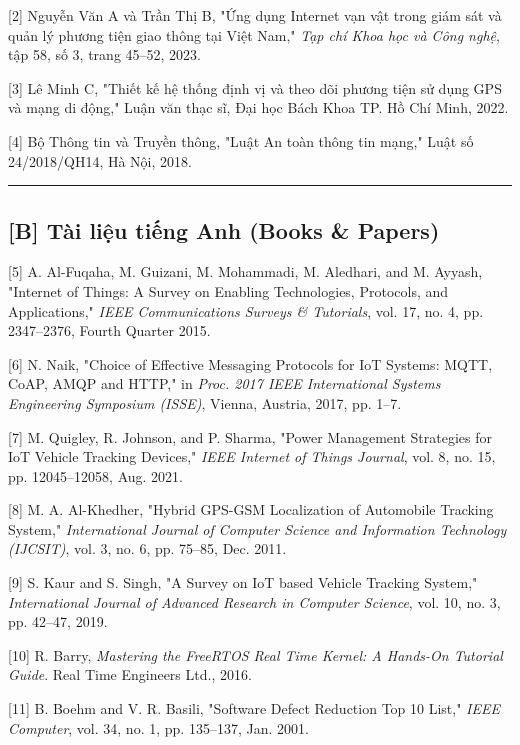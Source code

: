 \documentclass[a4paper]{extarticle}
\begin{document}
{[}2{]} Nguyễn Văn A và Trần Thị B, "Ứng dụng Internet vạn vật trong
giám sát và quản lý phương tiện giao thông tại Việt Nam," \emph{Tạp chí
Khoa học và Công nghệ}, tập 58, số 3, trang 45--52, 2023.

{[}3{]} Lê Minh C, "Thiết kế hệ thống định vị và theo dõi phương tiện sử
dụng GPS và mạng di động," Luận văn thạc sĩ, Đại học Bách Khoa TP. Hồ
Chí Minh, 2022.

{[}4{]} Bộ Thông tin và Truyền thông, "Luật An toàn thông tin mạng,"
Luật số 24/2018/QH14, Hà Nội, 2018.

\begin{center}\rule{0.5\linewidth}{0.5pt}\end{center}

\subsection{{[}B{]} Tài liệu tiếng Anh (Books \&
Papers)}\label{b-tuxe0i-liux1ec7u-tiux1ebfng-anh-books--papers}

{[}5{]} A. Al-Fuqaha, M. Guizani, M. Mohammadi, M. Aledhari, and M.
Ayyash, "Internet of Things: A Survey on Enabling Technologies,
Protocols, and Applications," \emph{IEEE Communications Surveys \&
Tutorials}, vol. 17, no. 4, pp. 2347--2376, Fourth Quarter 2015.

{[}6{]} N. Naik, "Choice of Effective Messaging Protocols for IoT
Systems: MQTT, CoAP, AMQP and HTTP," in \emph{Proc. 2017 IEEE
International Systems Engineering Symposium (ISSE)}, Vienna, Austria,
2017, pp. 1--7.

{[}7{]} M. Quigley, R. Johnson, and P. Sharma, "Power Management
Strategies for IoT Vehicle Tracking Devices," \emph{IEEE Internet of
Things Journal}, vol. 8, no. 15, pp. 12045--12058, Aug. 2021.

{[}8{]} M. A. Al-Khedher, "Hybrid GPS-GSM Localization of Automobile
Tracking System," \emph{International Journal of Computer Science and
Information Technology (IJCSIT)}, vol. 3, no. 6, pp. 75--85, Dec. 2011.

{[}9{]} S. Kaur and S. Singh, "A Survey on IoT based Vehicle Tracking
System," \emph{International Journal of Advanced Research in Computer
Science}, vol. 10, no. 3, pp. 42--47, 2019.

{[}10{]} R. Barry, \emph{Mastering the FreeRTOS Real Time Kernel: A
Hands-On Tutorial Guide}. Real Time Engineers Ltd., 2016.

{[}11{]} B. Boehm and V. R. Basili, "Software Defect Reduction Top 10
List," \emph{IEEE Computer}, vol. 34, no. 1, pp. 135--137, Jan. 2001.
\end{document}
